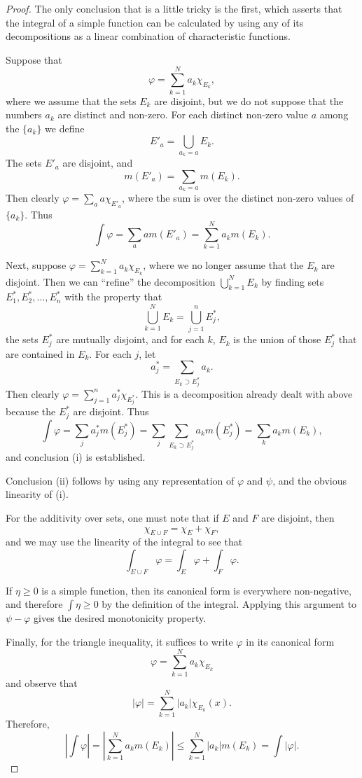 \documentclass[11pt,openany]{book}
\begin{document}
\begin{proof}
The only conclusion that is a little tricky is the first, which asserts that the integral of a simple function can be calculated by using any of its decompositions as a linear combination of characteristic functions.

Suppose that
\[
\varphi=\sum_{k=1}^{N}a_k\chi_{E_k},
\]
where we assume that the sets $E_k$ are disjoint, but we do not suppose that the numbers $a_k$ are distinct and non-zero. For each distinct non-zero value $a$ among the $\{a_k\}$ we define
\[
E'_a=\bigcup_{a_k=a}E_k.
\]
The sets $E'_a$ are disjoint, and
\[
m(E'_a)=\sum_{a_k=a}m(E_k).
\]
Then clearly $\varphi=\sum_a a\chi_{E'_a}$, where the sum is over the distinct non-zero values of $\{a_k\}$. Thus
\[
\int\varphi
=\sum_a am(E'_a)
=\sum_{k=1}^{N}a_km(E_k).
\]

Next, suppose $\varphi=\sum_{k=1}^{N}a_k\chi_{E_k}$, where we no longer assume that the $E_k$ are disjoint. Then we can ``refine'' the decomposition $\bigcup_{k=1}^{N}E_k$ by finding sets $E_1^*,E_2^*,\ldots,E_n^*$ with the property that
\[
\bigcup_{k=1}^{N}E_k=\bigcup_{j=1}^{n}E_j^*,
\]
the sets $E_j^*$ are mutually disjoint, and for each $k$, $E_k$ is the union of those $E_j^*$ that are contained in $E_k$. For each $j$, let
\[
a_j^*=\sum_{E_k\supset E_j^*}a_k.
\]
Then clearly $\varphi=\sum_{j=1}^{n}a_j^*\chi_{E_j^*}$. This is a decomposition already dealt with above because the $E_j^*$ are disjoint. Thus
\[
\int\varphi
=\sum_j a_j^*m(E_j^*)
=\sum_j\sum_{E_k\supset E_j^*}a_km(E_j^*)
=\sum_k a_km(E_k),
\]
and conclusion (i) is established.

Conclusion (ii) follows by using any representation of $\varphi$ and $\psi$, and the obvious linearity of (i).

For the additivity over sets, one must note that if $E$ and $F$ are disjoint, then
\[
\chi_{E\cup F}=\chi_E+\chi_F,
\]
and we may use the linearity of the integral to see that
\[
\int_{E\cup F}\varphi=\int_E\varphi+\int_F\varphi.
\]

If $\eta\geq0$ is a simple function, then its canonical form is everywhere non-negative, and therefore $\int\eta\geq0$ by the definition of the integral. Applying this argument to $\psi-\varphi$ gives the desired monotonicity property.

Finally, for the triangle inequality, it suffices to write $\varphi$ in its canonical form
\[
\varphi=\sum_{k=1}^{N}a_k\chi_{E_k}
\]
and observe that
\[
|\varphi|=\sum_{k=1}^{N}|a_k|\chi_{E_k}(x).
\]
Therefore,
\[
\left|\int\varphi\right|
=\left|\sum_{k=1}^{N}a_km(E_k)\right|
\leq\sum_{k=1}^{N}|a_k|m(E_k)
=\int|\varphi|.
\]
\end{proof}
\end{document}
